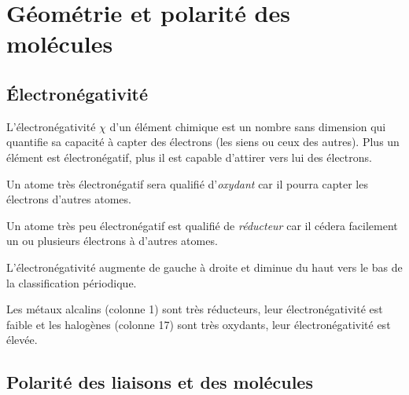 \documentclass{cours}
\begin{document}
\section{Géométrie et polarité des molécules}%
\label{sec:geometrie_et_polarite_des_molecules}

\subsection{Électronégativité}%
\label{sub:electronegativite}

L'électronégativité $\chi$ d'un élément chimique est un nombre sans dimension qui quantifie sa capacité à capter des électrons (les siens ou ceux des autres). Plus un élément est électronégatif, plus il est capable d'attirer vers lui des électrons.

Un atome très électronégatif sera qualifié d'\emph{oxydant} car il pourra capter les électrons d'autres atomes.

Un atome très peu électronégatif est qualifié de \emph{réducteur} car il cédera facilement un ou plusieurs électrons à d'autres atomes.

L'électronégativité augmente de gauche à droite et diminue du haut vers le bas de la classification périodique.

Les métaux alcalins (colonne 1) sont très réducteurs, leur électronégativité est faible et les halogènes (colonne 17) sont très oxydants, leur électronégativité est élevée.

\subsection{Polarité des liaisons et des molécules}%
\label{sub:polarite_des_liaisons_et_des_molecules}
\end{document}
